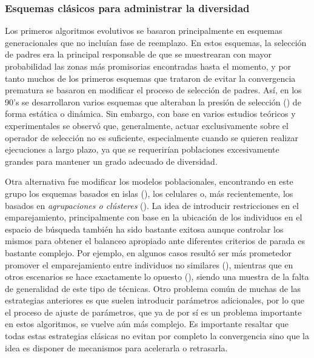 \subsubsection{Esquemas clásicos para administrar la diversidad}

Los primeros algoritmos evolutivos se basaron principalmente en esquemas generacionales que no incluían fase de reemplazo.
%
En estos esquemas, la selección de padres era la principal responsable de que se muestrearan con mayor probabilidad las zonas 
más promisorias encontradas hasta el momento, y por tanto muchos de los primeros esquemas que trataron de evitar la convergencia 
prematura se basaron en modificar el proceso de selección de padres.
%
Así, en los 90's se desarrollaron varios esquemas que alteraban la presión de selección (\cite{eiben2003introduction}) de forma 
estática o dinámica.
%
Sin embargo, con base en varios estudios teóricos y experimentales se observó que, generalmente, actuar exclusivamente sobre 
el operador de selección no es suficiente, especialmente cuando se quieren realizar ejecuciones a largo plazo, ya que se requerirían 
poblaciones excesivamente grandes para mantener un grado adecuado de diversidad.

Otra alternativa fue modificar los modelos poblacionales, encontrando en este grupo los esquemas basados en 
islas (\cite{alba2005parallel}), los celulares o, más recientemente, los basados en \textit{agrupaciones o clústeres} 
(\cite{gao2014cluster}).
%
La idea de introducir restricciones en el emparejamiento, principalmente con base en la ubicación de los individuos en el 
espacio de búsqueda también ha sido bastante exitosa aunque controlar los mismos para obtener el balanceo apropiado ante 
diferentes criterios de parada es bastante complejo.
%
Por ejemplo, en algunos casos resultó ser más prometedor promover el emparejamiento entre individuos no similares (\cite{Joel:CHC}), 
mientras que en otros escenarios se hace exactamente lo opuesto (\cite{deb1989investigation}), siendo una muestra de la falta
de generalidad de este tipo de técnicas.
%
Otro problema común de muchas de las estrategias anteriores es que suelen introducir parámetros adicionales, por lo que el 
proceso de ajuste de parámetros, que ya de por sí es un problema importante en estos algoritmos, se vuelve aún más complejo.
%
Es importante resaltar que todas estas estrategias clásicas no evitan por completo la convergencia sino que la idea es disponer 
de mecanismos para acelerarla o retrasarla.

